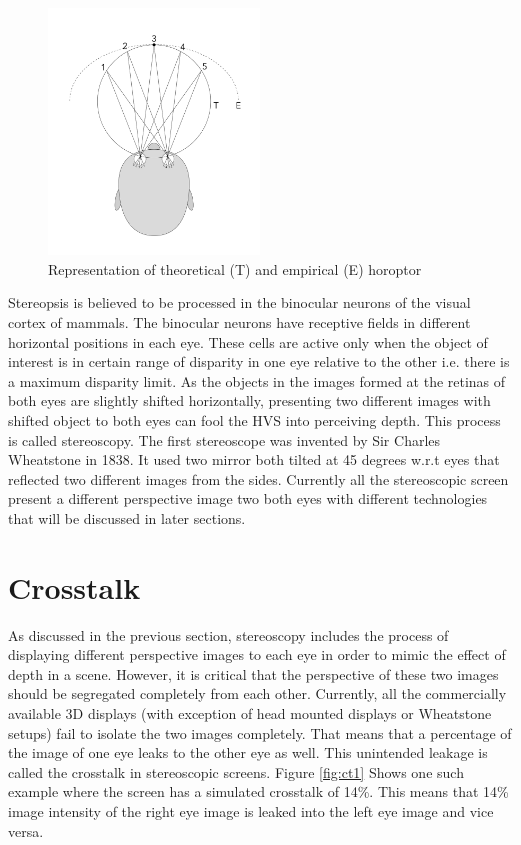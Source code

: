 \begin{figure}
\centering
    \includegraphics[width=0.5\textwidth]{./Template_Figures/horopter}
    \caption{Representation of theoretical (T) and empirical (E) horoptor\label{fig:horoptor}}
\end{figure}

Stereopsis is believed to be processed in the binocular neurons of the visual cortex of mammals. The binocular neurons have receptive fields in different horizontal positions in each eye. These cells are active only when the object of interest is in certain range of disparity in one eye relative to the other i.e. there is a maximum disparity limit. As the objects in the images formed at the retinas of both eyes are slightly shifted horizontally, presenting two different images with shifted object to both eyes can fool the HVS into perceiving depth. This process is called stereoscopy. The first stereoscope was invented by Sir Charles Wheatstone in 1838\cite{ wiki:wheatstone}. It used two mirror both tilted at 45 degrees w.r.t eyes that reflected two different images from the sides. Currently all the stereoscopic screen present a different perspective image two both eyes with different technologies that will be discussed in later sections.

\section{Crosstalk}
As discussed in the previous section, stereoscopy includes the process of displaying different perspective images to each eye in order to mimic the effect of depth in a scene. However, it is critical that the perspective of these two images should be segregated completely from each other. Currently, all the commercially available 3D displays (with exception of head mounted displays or Wheatstone setups) fail to isolate the two images completely. That means that a percentage of the image of one eye leaks to the other eye as well. This unintended leakage is called the crosstalk in stereoscopic screens\cite{woods2012crosstalk}. Figure \ref{fig:ct1} Shows one such example where the screen has a simulated crosstalk of 14\%. This means that 14\% image intensity of the right eye image is leaked into the left eye image and vice versa.

